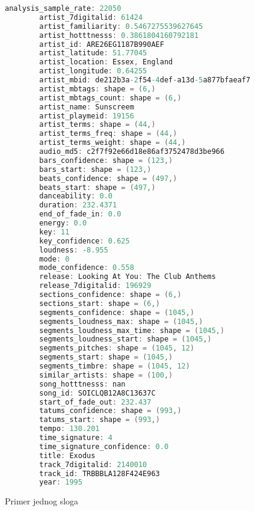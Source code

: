 \begin{figure}[H]
    \lstset{style=mystyle}
    \begin{lstlisting}[language=C, basicstyle=\footnotesize, numbers=none]
        analysis_sample_rate: 22050
        artist_7digitalid: 61424
        artist_familiarity: 0.5467275539627645
        artist_hotttnesss: 0.3861804160792181
        artist_id: ARE26EG1187B990AEF
        artist_latitude: 51.77045
        artist_location: Essex, England
        artist_longitude: 0.64255
        artist_mbid: de212b3a-2f54-4def-a13d-5a877bfaeaf7
        artist_mbtags: shape = (6,)
        artist_mbtags_count: shape = (6,)
        artist_name: Sunscreem
        artist_playmeid: 19156
        artist_terms: shape = (44,)
        artist_terms_freq: shape = (44,)
        artist_terms_weight: shape = (44,)
        audio_md5: c2f7f92e66d18e86af3752478d3be966
        bars_confidence: shape = (123,)
        bars_start: shape = (123,)
        beats_confidence: shape = (497,)
        beats_start: shape = (497,)
        danceability: 0.0
        duration: 232.4371
        end_of_fade_in: 0.0
        energy: 0.0
        key: 11
        key_confidence: 0.625
        loudness: -8.955
        mode: 0
        mode_confidence: 0.558
        release: Looking At You: The Club Anthems
        release_7digitalid: 196929
        sections_confidence: shape = (6,)
        sections_start: shape = (6,)
        segments_confidence: shape = (1045,)
        segments_loudness_max: shape = (1045,)
        segments_loudness_max_time: shape = (1045,)
        segments_loudness_start: shape = (1045,)
        segments_pitches: shape = (1045, 12)
        segments_start: shape = (1045,)
        segments_timbre: shape = (1045, 12)
        similar_artists: shape = (100,)
        song_hotttnesss: nan
        song_id: SOICLQB12A8C13637C
        start_of_fade_out: 232.437
        tatums_confidence: shape = (993,)
        tatums_start: shape = (993,)
        tempo: 130.201
        time_signature: 4
        time_signature_confidence: 0.0
        title: Exodus
        track_7digitalid: 2140010
        track_id: TRBBBLA128F424E963
        year: 1995
    \end{lstlisting}
    \caption{Primer jednog sloga}
    \label{primer:Song}
\end{figure}
